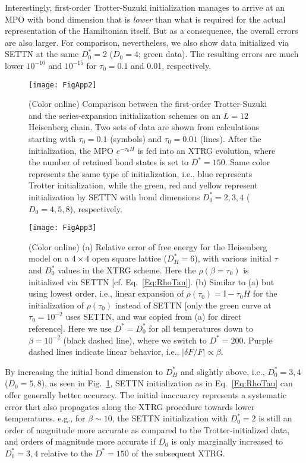 \documentclass[aps,prx,twocolumn,showpacs,psfig,superscriptaddress,longbibliography]{revtex4-1}
\newcommand{\Eq}[1]{Eq.~\eqref{#1}}
\newcommand{\Fig}[1]{Fig.~\ref{#1}}
\def\Dstar{D^\ast}
\def\taui{\tau_0}
\def\Dstari{\Dstar_0}
\def\Di{D_0}
\begin{document}
Interestingly, first-order Trotter-Suzuki initialization manages to
arrive at an MPO with bond dimension that is {\it lower} than what
is required for the actual representation of the Hamiltonian itself.
But as a consequence, the overall errors are also larger.  For
comparison, nevertheless, we also show data initialized via SETTN at
the same $\Dstari=2$ ($\Di=4$; green data).  The resulting errors
are much lower $10^{-10}$ and $10^{-15}$ for $\taui=0.1$ and 0.01,
respectively.

\begin{figure}[tbp]
\texttt{[image: FigApp2]}
\caption{(Color online) Comparison between the
   first-order Trotter-Suzuki and the series-expansion
   initialization schemes on an $L=12$ Heisenberg chain. Two
   sets of data are shown from calculations starting with
   $\taui=0.1$ (symbols) and $\taui=0.01$ (lines).  After the
   initialization, the MPO $e^{-\taui H}$ is fed into an XTRG
   evolution, where the number of retained bond states is set
   to $\Dstar=150$.  Same color represents the same type of
   initialization, i.e., blue represents Trotter
   initialization, while the green, red and yellow represent
   initialization by SETTN with bond dimensions $\Dstari =
   2, 3, 4$ ($\Di = 4,5,8$), respectively.
}
\label{Fig:Trotter}
\end{figure}

\begin{figure}[tbp]
\texttt{[image: FigApp3]}
\caption{(Color online) 
   (a) Relative error of free energy for the Heisenberg model
   on a $4 \times 4$ open square lattice {($\Dstar_H=6$)},
   with various initial $\tau$ {and $\Dstari$} values in the
   XTRG scheme.  Here the $\rho(\beta=\taui)$ is initialized
   via SETTN [cf. \Eq{Eq:RhoTau}].
   (b) Similar to (a) but using lowest order, i.e., linear
   expansion of $\rho(\taui)=\mathbb{I}-\taui H$ for the
   initialization of $\rho(\taui)$ instead of SETTN [only the
   green curve at $\taui=10^{-2}$ uses SETTN, and was copied
   from (a) for direct reference].  Here we use $\Dstar =
   \Dstari$ for all temperatures down to $\beta=10^{-2}$
   (black dashed line), where we switch to $\Dstar=200$.
   Purple dashed lines indicate linear behavior, i.e.,
   $|\delta F/F| \propto \beta$.
}
\label{Fig:VariTau}
\end{figure}

By increasing the initial bond dimension to $\Dstar_H$ and slightly
above, i.e., $\Dstari=3,4$ ($\Di=5,8$), as seen in
\Fig{Fig:Trotter}, SETTN initialization as in \Eq{Eq:RhoTau} can
offer generally better accuracy.  The initial inaccuarcy represents
a systematic error that also propagates along the XTRG procedure
towards lower temperatures.  e.g., for $\beta \sim 10$, the SETTN
initialization with $\Dstari=2$ is still an order of magnitude more
accurate as compared to the Trotter-initialized data, and orders of
magnitude more accurate if $\Di$ is only marginally increased to
$\Dstari=3,4$ relative to the $\Dstar=150$ of the subsequent XTRG.
\end{document}
